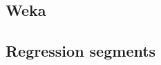 
\subsection{Weka}\label{patterns:weka}

\subsection{Regression segments}\label{patterns:segmentation}
